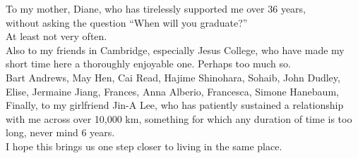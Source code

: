 \documentclass[thesis]{subfiles}
\begin{document}

\begin{dedication} 

To my mother, Diane, who has tirelessly supported me over 36 years,\\
without asking the question ``When will you graduate?''\\
At least not very often.
\vspace{6.66em}\\
Also to my friends in Cambridge, especially Jesus College, who have made my short time here a thoroughly enjoyable one. Perhaps too much so.\vspace{1em}\\
Bart Andrews, May Hen, Cai Read, Hajime Shinohara, Sohaib, John Dudley, Elise, Jermaine Jiang, Frances, Anna Alberio, Francesca, Simone Hanebaum,
\vspace{3.33em}
Finally, to my girlfriend Jin-A Lee, who has patiently sustained a relationship with me across over 10,000 km, something for which any duration of time is too long, never mind 6 years.\\
I hope this brings us one step closer to living in the same place.
\end{dedication}
\end{document}
